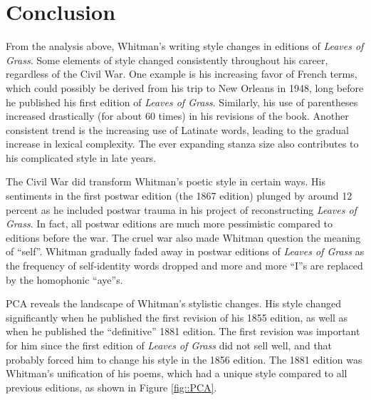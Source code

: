 \documentclass[12pt]{article}
\begin{document}
\section{Conclusion}
From the analysis above, Whitman's writing style changes in editions of \textit{Leaves of Grass}. Some elements of style changed consistently throughout his career, regardless of the Civil War. One example is his increasing favor of French terms, which could possibly be derived from his trip to New Orleans in 1948, long before he published his first edition of \textit{Leaves of Grass}. Similarly, his use of parentheses increased drastically (for about 60 times) in his revisions of the book. Another consistent trend is the increasing use of Latinate words, leading to the gradual increase in lexical complexity. The ever expanding stanza size also contributes to his complicated style in late years.

\par
The Civil War did transform Whitman's poetic style in certain ways. His sentiments in the first postwar edition (the 1867 edition) plunged by around 12 percent as he included postwar trauma in his project of reconstructing \textit{Leaves of Grass}. In fact, all postwar editions are much more pessimistic compared to editions before the war. The cruel war also made Whitman question the meaning of ``self''. Whitman gradually faded away in postwar editions of \textit{Leaves of Grass} as the frequency of self-identity words dropped and more and more ``I''s are replaced by the homophonic ``aye''s.

\par
PCA reveals the landscape of Whitman's stylistic changes. His style changed significantly when he published the first revision of his 1855 edition, as well as when he published the ``definitive'' 1881 edition. The first revision was important for him since the first edition of \textit{Leaves of Grass} did not sell well, and that probably forced him to change his style in the 1856 edition. The 1881 edition was Whitman's unification of his poems, which had a unique style compared to all previous editions, as shown in Figure \ref{fig::PCA}.

\newpage
\theendnotes
\end{document}
